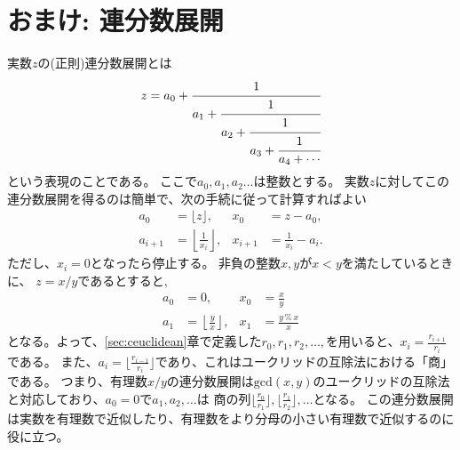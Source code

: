 \documentclass[a4paper,twoside,onecolumn,openany,article,10pt]{memoir}
\theoremstyle{remark}
\begin{document}
\section{おまけ: 連分数展開}
実数$z$の(正則)連分数展開とは
\begin{equation*}
z=a_0 + \cfrac1{a_1+\cfrac1{a_2+\cfrac1{a_3+\cfrac1{a_4+\dotsb}}}}
\end{equation*}
という表現のことである。
ここで$a_0,a_1,a_2\dotsc$は整数とする。
実数$z$に対してこの連分数展開を得るのは簡単で、次の手続に従って計算すればよい
\begin{align*}
a_0 &= \lfloor z\rfloor,&
x_0 &= z-a_0,\\
a_{i+1} &= \left\lfloor \frac1{x_i}\right\rfloor,&
x_{i+1} &= \frac1{x_i} - a_i.
\end{align*}
ただし、$x_i=0$となったら停止する。
非負の整数$x, y$が$x< y$を満たしているときに、 $z=x/y$であるとすると,
\begin{align*}
a_0 &= 0,& x_0 &= \frac{x}{y}\\
a_1 &= \left\lfloor \frac{y}{x} \right\rfloor,&
x_1 &= \frac{y\,\%\,x}{x}
\end{align*}
となる。よって、\ref{sec:ceuclidean}章で定義した$r_0,r_1,r_2,\dotsc,$を用いると、$x_i = \frac{r_{i+1}}{r_i}$である。
また、$a_i = \lfloor\frac{r_{i-1}}{r_i}\rfloor$であり、これはユークリッドの互除法における「商」である。
つまり、有理数$x/y$の連分数展開は$\mathrm{gcd}(x, y)$のユークリッドの互除法と対応しており、$a_0=0$で$a_1,a_2,\dotsc$は
商の列$\lfloor\frac{r_{0}}{r_1}\rfloor,\lfloor\frac{r_{1}}{r_2}\rfloor,\dotsc$となる。
この連分数展開は実数を有理数で近似したり、有理数をより分母の小さい有理数で近似するのに役に立つ。
\end{document}
